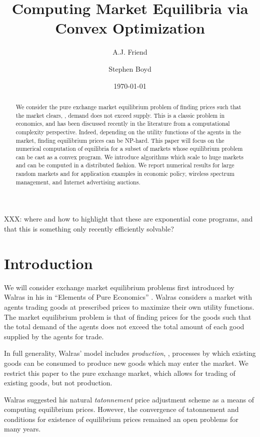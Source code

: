 \documentclass[12pt]{article}
\title{Computing Market Equilibria via Convex Optimization}
\author{A.J. Friend \and Stephen Boyd}
\date{\today}
\begin{document}
\maketitle

\begin{abstract}
We consider the pure exchange market equilibrium problem of finding prices
such that the market clears, \ie, demand does not exceed supply.
This is a classic problem in economics, and has been discussed recently
in the literature from a computational complexity perspective.
Indeed, depending on the utility functions of the agents in the market,
finding equilibrium prices can be NP-hard.
This paper will focus on the numerical computation
of equilibria for a subset of markets whose equilibrium
problem can be cast as a convex program.
We introduce algorithms which scale to huge markets and can be computed
in a distributed fashion.
We report numerical results for large random markets and for
application examples in economic policy, wireless spectrum management,
and Internet advertising auctions.
\end{abstract}

\newpage
\tableofcontents
\newpage

XXX: where and how to highlight that these are exponential cone programs, and that this is something only recently efficiently solvable?

\section{Introduction}
We will consider exchange market equilibrium problems first introduced by
Walras in his in ``Elements of Pure Economics''
\cite{walras1896elements}.
Walras considers a market with agents trading
goods at prescribed prices to maximize their own utility functions.
The market equilibrium problem is that of finding prices for the goods
such that the total demand of the agents does not exceed the total amount
of each good supplied by the agents for trade.

In full generality, Walras' model includes \emph{production}, \ie, processes by which existing goods can be consumed to produce new goods which may enter the market.
We restrict this paper to the pure exchange market, which allows for trading of existing goods, but not production.

Walras suggested his natural \emph{tatonnement} price adjustment scheme as a means of computing equilibrium prices.
However, the convergence of tatonnement and conditions for existence of equilibrium prices remained an open problems for many years.
\end{document}
